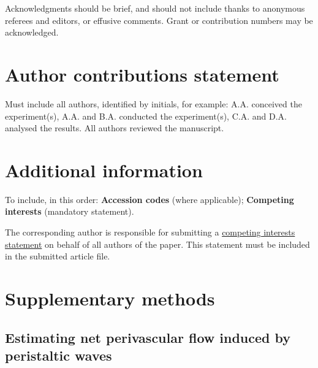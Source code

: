 \documentclass[fleqn,10pt]{wlscirep}
\begin{document}
Acknowledgments should be brief, and should not include thanks to anonymous referees and editors, or effusive comments. Grant or contribution numbers may be acknowledged.

\section*{Author contributions statement}

Must include all authors, identified by initials, for example:
A.A. conceived the experiment(s),  A.A. and B.A. conducted the experiment(s), C.A. and D.A. analysed the results.  All authors reviewed the manuscript. 

\section*{Additional information}

To include, in this order: \textbf{Accession codes} (where applicable); \textbf{Competing interests} (mandatory statement). 

The corresponding author is responsible for submitting a \href{http://www.nature.com/srep/policies/index.html#competing}{competing interests statement} on behalf of all authors of the paper. This statement must be included in the submitted article file.


\newpage
\appendix

\section{Supplementary methods}

\subsection{Estimating net perivascular flow induced by peristaltic waves}

\label{sec:sup:peristalsis}
\end{document}
